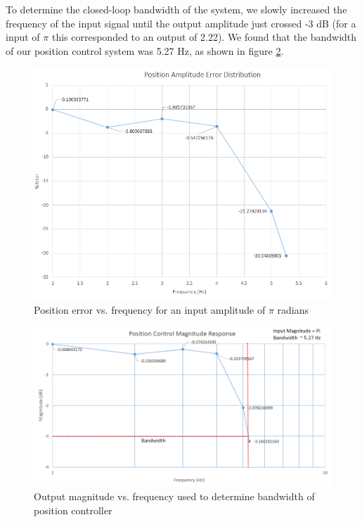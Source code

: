 \documentclass[letterpaper]{article}
\begin{document}
To determine the closed-loop bandwidth of the system, we slowly increased the frequency of the input signal until the output amplitude just crossed -3 dB (for a input of $\pi$ this corresponded to an output of 2.22). We found that the bandwidth of our position control system was 5.27 Hz, as shown in figure \ref{PosBandwidth}.

\begin{figure}[H]
\begin{center}
\includegraphics[scale=0.5]{PositionControl_Error.png}
\caption{Position error vs. frequency for an input amplitude of $\pi$ radians}
\label{PosFreqError}
\end{center}
\end{figure}

\begin{figure}[H]
\begin{center}
\includegraphics[scale=0.46]{PositionControl_Magnitude.png}
\caption{Output magnitude vs. frequency used to determine bandwidth of position controller}
\label{PosBandwidth}
\end{center}
\end{figure}
\end{document}
